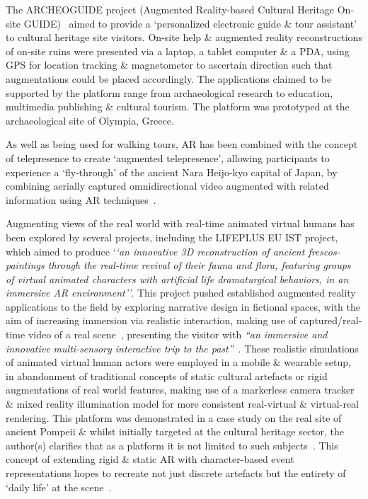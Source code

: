 
The ARCHEOGUIDE project (Augmented Reality-based Cultural Heritage On-site GUIDE)~\cite{vlahakis:archeoguide} aimed to provide a `personalized electronic guide \& tour assistant' to cultural heritage site visitors. On-site help \& augmented reality reconstructions of on-site ruins were presented via a laptop, a tablet computer \& a PDA, using GPS for location tracking \& magnetometer to ascertain direction such that augmentations could be placed accordingly. The applications claimed to be supported by the platform range from archaeological research to education, multimedia publishing \& cultural tourism. The platform was prototyped at the archaeological site of Olympia, Greece.

As well as being used for walking tours, AR has been combined with the concept of telepresence to create `augmented telepresence', allowing participants to experience a `fly-through' of the ancient Nara Heijo-kyo capital of Japan, by combining aerially captured omnidirectional video augmented with related information using AR techniques~\cite{Okura2006,Okura2011}.

Augmenting views of the real world with real-time animated virtual humans has been explored by several projects, including the LIFEPLUS EU IST project, which aimed to produce `\textit{`an innovative 3D reconstruction of ancient frescos-paintings through the real-time revival of their fauna and flora, featuring groups of virtual animated characters with artificial life dramaturgical behaviors, in an immersive AR environment''}. This project pushed established augmented reality applications to the field by exploring narrative design in fictional spaces, with the aim of increasing immersion via realistic interaction, making use of captured/real-time video of a real scene~\cite{Papagiannakis2004}, presenting the visitor with \textit{``an immersive and innovative multi-sensory interactive trip to the past''}~\cite{Papagiannakis2005}. These realistic simulations of animated virtual human actors were employed in a mobile \& wearable setup, in abandonment of traditional concepts of static cultural artefacts or rigid augmentations of real world features, making use of a markerless camera tracker \& mixed reality illumination model for more consistent real-virtual \& virtual-real rendering. This platform was demonstrated in a case study on the real site of ancient Pompeii \& whilst initially targeted at the cultural heritage sector, the author(s) clarifies that as a platform it is not limited to such subjects~\cite{Papagiannakis2007}. This concept of extending rigid \& static AR with character-based event representations hopes to recreate not just discrete artefacts but the entirety of `daily life' at the scene~\cite{Papagiannakis2009}.

